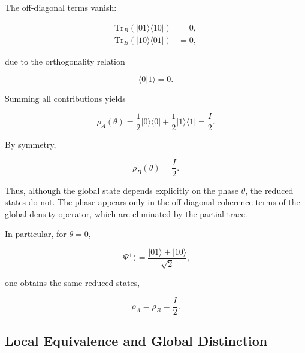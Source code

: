 The off-diagonal terms vanish:

\begin{align}
\mathrm{Tr}_B
\left(
|01\rangle\langle 10|
\right)
&=
0,
\nonumber
\\
\mathrm{Tr}_B
\left(
|10\rangle\langle 01|
\right)
&=
0,
\label{eq:appendix_partial_trace_offdiagonal}
\end{align}

due to the orthogonality relation

\[
\langle 0|1\rangle = 0.
\]

Summing all contributions yields

\begin{equation}
\rho_A(\theta)
=
\frac{1}{2}
|0\rangle\langle 0|
+
\frac{1}{2}
|1\rangle\langle 1|
=
\frac{I}{2}.
\label{eq:appendix_reduced_density_A}
\end{equation}

By symmetry,

\begin{equation}
\rho_B(\theta)
=
\frac{I}{2}.
\label{eq:appendix_reduced_density_B}
\end{equation}

Thus, although the global state depends explicitly on the phase \( \theta \), the reduced states do not. The phase appears only in the off-diagonal coherence terms of the global density operator, which are eliminated by the partial trace.

\medskip

In particular, for \( \theta = 0 \),

\begin{equation}
|\Psi^+\rangle
=
\frac{
|01\rangle
+
|10\rangle
}{
\sqrt{2}
},
\label{eq:appendix_standard_bell_state}
\end{equation}

one obtains the same reduced states,

\begin{equation}
\rho_A
=
\rho_B
=
\frac{I}{2}.
\label{eq:appendix_standard_bell_reduced}
\end{equation}


\subsection*{Local Equivalence and Global Distinction}

